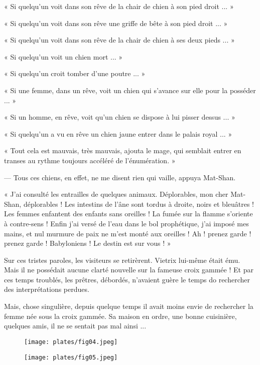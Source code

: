 \documentclass[a4paper, 11pt, oneside, polutonikogreek, french]{article}
\begin{document}
« Si quelqu'un voit dans son rêve de la chair de chien à son pied droit ... »

« Si quelqu'un voit dans son rêve une griffe de bête à son pied droit ... »

« Si quelqu'un voit dans son rêve de la chair de chien à ses deux pieds ... »

« Si quelqu'un voit un chien mort ... »

« Si quelqu'un croit tomber d'une poutre ... »

« Si une femme, dans un rêve, voit un chien qui s'avance sur elle pour la posséder ... »

« Si un homme, en rêve, voit qu'un chien se dispose à lui pisser dessus ... »

« Si quelqu'un a vu en rêve un chien jaune entrer dans le palais royal ... »

\bigskip
\centerline{\EightStarTaper}
\centerline{\EightStarTaper\EightStarTaper}
\bigskip

« Tout cela est mauvais, très mauvais, ajouta le mage, qui semblait entrer en transes au rythme toujours accéléré de l'énumération. »

--- Tous ces chiens, en effet, ne me disent rien qui vaille, appuya Mat-Shan.

« J'ai consulté les entrailles de quelques animaux. Déplorables, mon cher Mat-Shan, déplorables ! Les intestins de l'âne sont tordus à droite, noirs et bleuâtres ! Les femmes enfantent des enfants sans oreilles ! La fumée sur la flamme s'oriente à contre-sens ! Enfin j'ai versé de l'eau dans le bol prophétique, j'ai imposé mes mains, et nul murmure de paix ne m'est monté aux oreilles ! Ah ! prenez garde ! prenez garde ! Babyloniens ! Le destin est sur vous ! »

Sur ces tristes paroles, les visiteurs se retirèrent. Vietrix lui-même était ému. Mais il ne possédait aucune clarté nouvelle sur la fameuse croix gammée ! Et par ces temps troublés, les prêtres, débordés, n'avaient guère le temps do rechercher des interprétations perdues.

Mais, chose singulière, depuis quelque temps il avait moins envie de rechercher la femme née sous la croix gammée. Sa maison en ordre, une bonne cuisinière, quelques amis, il ne se sentait pas mal ainsi ...

\begin{figure}[H]
\centering
\texttt{[image: plates/fig04.jpeg]}
\end{figure}
\clearpage
\begin{figure}[H]
\centering
\texttt{[image: plates/fig05.jpeg]}
\end{figure}
\end{document}
